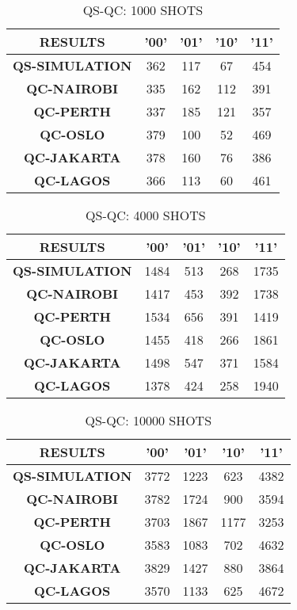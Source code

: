 \begin{table}[!ht]
    \centering
    \begin{tabular}{ccccc}
    \hline
        \textbf{RESULTS} & \textbf{'00'} & \textbf{'01'} & \textbf{'10'} & \textbf{'11' } \\ \hline
        \textbf{QS-SIMULATION} & 362 & 117 & 67 & 454  \\ 
        \textbf{QC-NAIROBI} & 335 & 162 & 112 & 391  \\ 
        \textbf{QC-PERTH} & 337 & 185 & 121 & 357  \\ 
        \textbf{QC-OSLO} & 379 & 100 & 52 & 469  \\ 
        \textbf{QC-JAKARTA} & 378 & 160 & 76 & 386  \\ 
        \textbf{QC-LAGOS} & 366 & 113 & 60 & 461 \\ \hline
    \end{tabular}
    \caption{QS-QC: 1000 SHOTS}
\end{table}

\begin{table}[!ht]
    \centering
    \begin{tabular}{ccccc}
    \hline
        \textbf{RESULTS} & \textbf{'00'} & \textbf{'01'} & \textbf{'10'} & \textbf{'11' } \\ \hline
        \textbf{QS-SIMULATION} & 1484 & 513 & 268 & 1735  \\ 
        \textbf{QC-NAIROBI} & 1417 & 453 & 392 & 1738  \\ 
        \textbf{QC-PERTH} & 1534 & 656 & 391 & 1419  \\ 
        \textbf{QC-OSLO} & 1455 & 418 & 266 & 1861  \\ 
        \textbf{QC-JAKARTA} & 1498 & 547 & 371 & 1584  \\ 
        \textbf{QC-LAGOS} & 1378 & 424 & 258 & 1940 \\ \hline
    \end{tabular}
    \caption{QS-QC: 4000 SHOTS}
\end{table}

\begin{table}[!ht]
    \centering
    \begin{tabular}{ccccc}
    \hline
        \textbf{RESULTS} & \textbf{'00'} & \textbf{'01'} & \textbf{'10'} & \textbf{'11' } \\ \hline
        \textbf{QS-SIMULATION} & 3772 & 1223 & 623 & 4382  \\ 
        \textbf{QC-NAIROBI} & 3782 & 1724 & 900 & 3594  \\ 
        \textbf{QC-PERTH} & 3703 & 1867 & 1177 & 3253  \\ 
        \textbf{QC-OSLO} & 3583 & 1083 & 702 & 4632  \\ 
        \textbf{QC-JAKARTA} & 3829 & 1427 & 880 & 3864  \\ 
        \textbf{QC-LAGOS} & 3570 & 1133 & 625 & 4672 \\ \hline
    \end{tabular}
    \caption{QS-QC: 10000 SHOTS}
\end{table}

